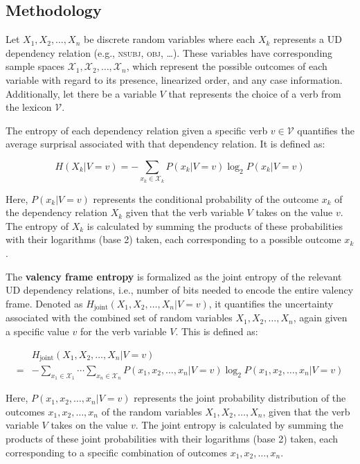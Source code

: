 \subsection{Methodology}

Let $X_1, X_2,\ldots,X_n$ be discrete random variables where each $X_k$ represents a UD dependency relation (e.g., \textsc{nsubj}, \textsc{obj}, \ldots). These variables have corresponding sample spaces $\mathcal{X}_1, \mathcal{X}_2, \ldots, \mathcal{X}_n$, which represent the possible outcomes of each variable with regard to its presence, linearized order, and any case information. Additionally, let there be a variable $V$ that represents the choice of a verb from the lexicon $\mathcal{V}$. 

The entropy of each dependency relation given a specific verb $v \in \mathcal{V}$ quantifies the average surprisal associated with that dependency relation. It is defined as:

\begin{equation*}
  H(X_{k}|V=v)=
  -\sum\limits_{x_{k}\in{}\mathcal{X}_{k}}{P(x_{k}|V=v)\log_{2}{P(x_{k}|V=v)}}  
\end{equation*}

Here, $P(x_k | V = v)$ represents the conditional probability of the outcome $x_k$ of the dependency relation $X_k$ given that the verb variable $V$ takes on the value $v$. The entropy of $X_k$ is calculated by summing the products of these probabilities with their logarithms (base 2) taken, each corresponding to a possible outcome $x_k$.


The \textbf{valency frame entropy} is formalized as the joint entropy of the relevant UD dependency relations, i.e., number of bits needed to encode the entire valency frame. Denoted as $H_{\text{joint}}(X_1, X_2, \ldots, X_n | V = v)$, it quantifies the uncertainty associated with the combined set of random variables $X_1, X_2, \ldots, X_n$, again given a specific value $v$ for the verb variable $V$. This is defined as:

\begin{equation*}
\begin{split}
 & H_{\text{joint}}(X_1, X_2, \ldots, X_n | V=v) \\
=& -\sum\limits_{x_1\in{}\mathcal{X}_1}\cdots\sum\limits_{x_n\in{}\mathcal{X}_n}{P(x_1, x_2, \ldots,x_{n}|V=v)\log_2P(x_1, x_2, \ldots,x_n|V=v)}
\end{split}
\end{equation*}

Here, $P(x_1, x_2, \ldots, x_n | V = v)$ represents the joint probability distribution of the outcomes $x_1, x_2, \ldots, x_n$ of the random variables $X_1, X_2, \ldots, X_n$, given that the verb variable $V$ takes on the value $v$. The joint entropy is calculated by summing the products of these joint probabilities with their logarithms (base 2) taken, each corresponding to a specific combination of outcomes $x_1, x_2, \ldots, x_n$.

